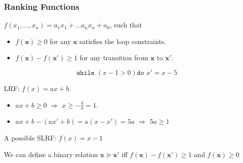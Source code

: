 \documentclass[11pt]{beamer}
\begin{document}
\begin{frame}\frametitle{Ranking Functions}

\begin{definition}

$f(x_1, \ldots, x_n) = a_1x_1 + \ldots a_nx_n + a_0$, such that

\begin{itemize}
\item $f(\textbf{x}) \ge 0$ for any $\textbf{x}$ satisfies the loop constraints.

\item $f(\textbf{x}) - f(\textbf{x}') \ge 1$ for any transition from $\textbf{x}$ to $\textbf{x}'$.



\end{itemize}
\end{definition}

\begin{example}
\[\texttt{while }( x - 1 > 0) \texttt{do } x' = x - 5\]

LRF: $f(x) = ax + b$.
\begin{itemize}
\item $ax + b \ge 0$ $\Rightarrow$ $x \ge -\frac{b}{a} = 1$.
\item $ax + b - (ax' + b) = a(x - x') = 5a$ $\Rightarrow$ $5a \ge 1$
\end{itemize}
A possible SLRF: $f(x) = x - 1$
\end{example}

We can define a binary relation $\textbf{x} \succeq \textbf{x}'$ iff  $f(\textbf{x}) - f(\textbf{x}') \ge 1$ and $f(\textbf{x}) \ge 0$

\end{frame}
\end{document}
